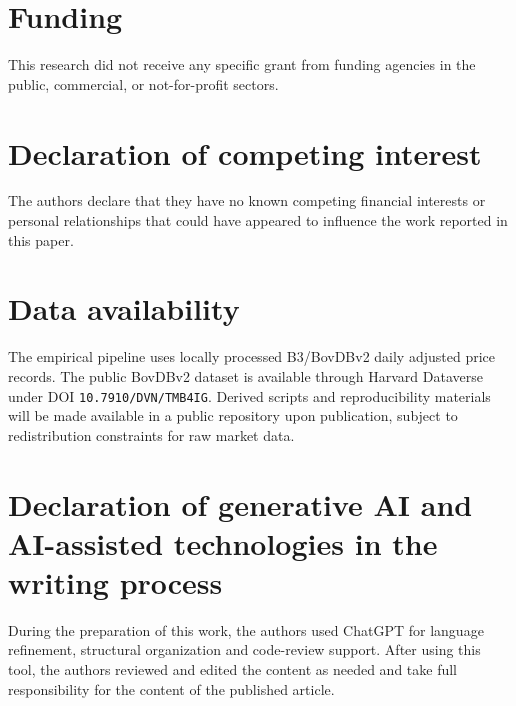 \section*{Funding}
This research did not receive any specific grant from funding agencies in the public, commercial, or not-for-profit sectors.

\section*{Declaration of competing interest}
The authors declare that they have no known competing financial interests or personal relationships that could have appeared to influence the work reported in this paper.

\section*{Data availability}
The empirical pipeline uses locally processed B3/BovDBv2 daily adjusted price records. The public BovDBv2 dataset is available through Harvard Dataverse under DOI \texttt{10.7910/DVN/TMB4IG}. Derived scripts and reproducibility materials will be made available in a public repository upon publication, subject to redistribution constraints for raw market data.

\section*{Declaration of generative AI and AI-assisted technologies in the writing process}
During the preparation of this work, the authors used ChatGPT for language refinement, structural organization and code-review support. After using this tool, the authors reviewed and edited the content as needed and take full responsibility for the content of the published article.
